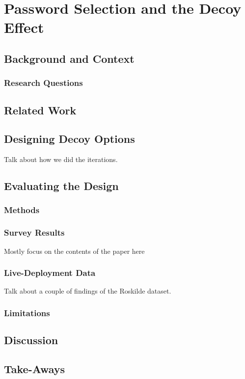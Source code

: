 \chapter[Password Selection and the Decoy Effect]{Password Selection and the Decoy Effect}\label{chap:decoy}


\section{Background and Context}

\subsection{Research Questions}

\section{Related Work}

\section{Designing Decoy Options}

Talk about how we did the iterations.

\section{Evaluating the Design}
\subsection{Methods}

\subsection{Survey Results}
Mostly focus on the contents of the paper here

\subsection{Live-Deployment Data}
Talk about a couple of findings of the Roskilde dataset. 

\subsection{Limitations}


\section{Discussion}


\section{Take-Aways}



